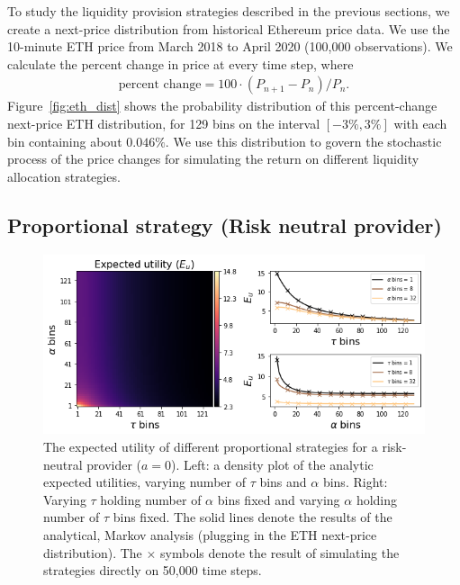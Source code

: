 \documentclass[sigconf, usenames, dvipsnames]{acmart}
\newcommand{\dcp}[1]{\textcolor{blue}{{\scriptsize{David:}}#1}}
\newcommand{\rithvik}[1]{\textcolor{cyan}{{\scriptsize{Rithvik: }}[[#1]]}}
\begin{document}
To study the liquidity provision strategies described in the previous sections, we create a next-price  distribution from historical Ethereum price data. We use the 10-minute ETH price from March 2018 to April 2020 (100,000 observations). We calculate the percent change in price at every time step, where
\begin{align}
    \text{percent change} = 100 \cdot (P_{n+1} - P_{n}) / P_{n}.
\end{align}
%
Figure~\ref{fig:eth_dist} shows the probability distribution of this percent-change next-price ETH distribution, for 129 bins on the interval $[-3\%,3\%]$ with each bin containing about $0.046\%$.
We use this distribution to govern the stochastic process of the price changes for simulating the return on different  liquidity allocation strategies.



\subsection{Proportional strategy (Risk neutral provider)}

\begin{figure}
    \centering
    \includegraphics[width=0.8\linewidth]{img/result_sim.png}
    \caption{The expected utility of different proportional strategies for a risk-neutral provider ($a=0$). Left: a density plot of the analytic expected utilities, varying number of $\tau$ bins and $\alpha$ bins. Right: Varying $\tau$ holding number of $\alpha$ bins fixed and varying $\alpha$ holding number of $\tau$ bins fixed. The solid lines denote the results of the analytical, Markov analysis (plugging in the ETH next-price distribution). The $\times$ symbols denote the result of simulating the strategies directly on 50,000 time steps. 
    \label{fig:result_sim}}
\end{figure}
\end{document}
